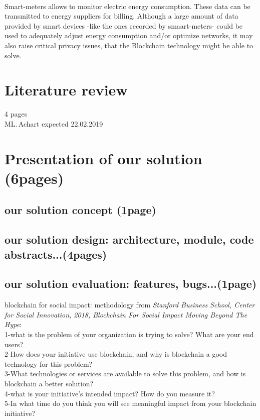 \documentclass[11pt]{article}
\begin{document}
\\
Smart-meters allows to monitor electric energy consumption. These data can be transmitted to energy suppliers for billing. Although a large amount of data provided by smart devices -like the ones recorded by smaart-meters- could be used to adequately adjust energy consumption and/or optimize networks, it may also raise critical privacy issues,\cite{4} that the Blockchain technology might be able to solve.

\section{Literature review}
4 pages\\
ML.\,Achart expected 22.02.2019

\section{Presentation of our solution (6pages)}
\subsection{our solution concept (1page)}
\subsection{our solution design: architecture, module, code abstracts...(4pages)}
\subsection{our solution evaluation: features, bugs...(1page)}
blockchain for social impact: methodology from \textit{Stanford Business School, Center for Social Innovation, 2018, Blockchain For Social Impact Moving Beyond The Hype}:\\
1-what is the problem of your organization is trying to solve? What are your end users?\\
2-How does your initiative use blockchain, and why is blockchain a good technology for this problem?\\
3-What technologies or services are available to solve this problem, and how is blockchain a better solution?\\
4-what is your initiative's intended impact? How do you measure it?\\
5-In what time do you think you will see meaningful impact from your blockchain initiative?\\
\end{document}

